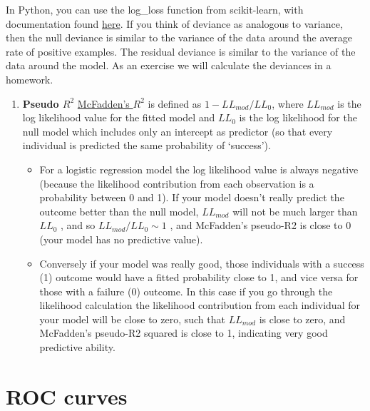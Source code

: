 \documentclass[
  letterpaper,
  DIV=11,
  numbers=noendperiod]{scrreprt}
\providecommand{\tightlist}{%
  \setlength{\itemsep}{0pt}\setlength{\parskip}{0pt}}\usepackage{longtable,booktabs,array}
\begin{document}
In Python, you can use the log\_loss function from scikit-learn, with
documentation found
\href{http://scikit-learn.org/stable/modules/generated/sklearn.metrics.log_loss.html}{here}.
If you think of deviance as analogous to variance, then the null
deviance is similar to the variance of the data around the average rate
of positive examples. The residual deviance is similar to the variance
of the data around the model. As an exercise we will calculate the
deviances in a homework.

\begin{enumerate}
\def\labelenumi{\arabic{enumi}.}
\setcounter{enumi}{3}
\tightlist
\item
  \textbf{Pseudo \(R^2\)}
  \href{http://thestatsgeek.com/2014/02/08/r-squared-in-logistic-regression/}{McFadden's
  \(R^2\)} is defined as \(1−LL_{mod}/LL_0\), where \(LL_{mod}\) is the
  log likelihood value for the fitted model and \(LL_{0}\) is the log
  likelihood for the null model which includes only an intercept as
  predictor (so that every individual is predicted the same probability
  of `success').

  \begin{itemize}
  \tightlist
  \item
    For a logistic regression model the log likelihood value is always
    negative (because the likelihood contribution from each observation
    is a probability between 0 and 1). If your model doesn't really
    predict the outcome better than the null model, \(LL_{mod}\) will
    not be much larger than \(LL_{0}\) , and so \(LL_{mod}/LL_0 \sim 1\)
    , and McFadden's pseudo-R2 is close to 0 (your model has no
    predictive value).
  \item
    Conversely if your model was really good, those individuals with a
    success (1) outcome would have a fitted probability close to 1, and
    vice versa for those with a failure (0) outcome. In this case if you
    go through the likelihood calculation the likelihood contribution
    from each individual for your model will be close to zero, such that
    \(LL_{mod}\) is close to zero, and McFadden's pseudo-R2 squared is
    close to 1, indicating very good predictive ability.
  \end{itemize}
\end{enumerate}

\hypertarget{roc-curves}{%
\section{ROC curves}\label{roc-curves}}
\end{document}
